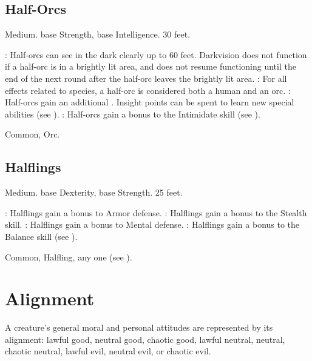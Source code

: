     \subsection{Half-Orcs}
         Medium.
          base Strength,  base Intelligence.
         30 feet.
        \begin{itemize}
            : Half-orcs can see in the dark clearly up to 60 feet. Darkvision does not function if a half-orc is in a brightly lit area, and does not resume functioning until the end of the next round after the half-orc leaves the brightly lit area.
            : For all effects related to species, a half-orc is considered both a human and an orc.
            : Half-orcs gain an additional .
                Insight points can be spent to learn new special abilities (see ).
            : Half-orcs gain a  bonus to the Intimidate skill (see ).
        \end{itemize}
         Common, Orc.

    \subsection{Halflings}
         Medium.
          base Dexterity,  base Strength.
         25 feet.
        \begin{itemize}
            : Halflings gain a  bonus to Armor defense.
            : Halflings gain a  bonus to the Stealth skill.
            : Halflings gain a  bonus to Mental defense.
            : Halflings gain a  bonus to the Balance skill (see ).
        \end{itemize}
         Common, Halfling, any one  (see ).

\section{Alignment}\label{Alignment}
    A creature's general moral and personal attitudes are represented by its alignment: lawful good, neutral good, chaotic good, lawful neutral, neutral, chaotic neutral, lawful evil, neutral evil, or chaotic evil.

